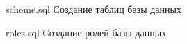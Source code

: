 
\begin{appendices}
\chapter{}
    {scheme.sql}
    {Создание таблиц базы данных}

    {roles.sql}
    {Создание ролей базы данных}
\end{appendices}